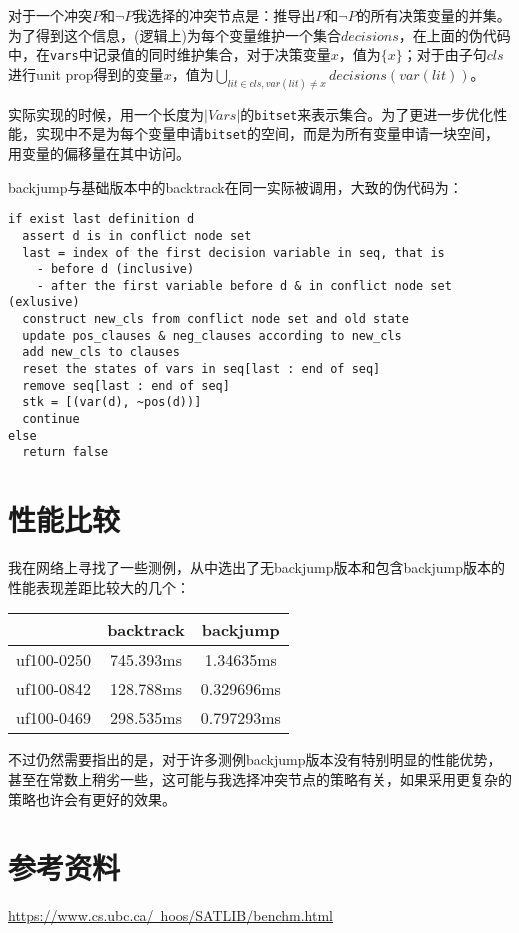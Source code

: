 \documentclass[12pt, UTF8]{article}
\begin{document}
对于一个冲突$P$和$\lnot P$我选择的冲突节点是：推导出$P$和$\lnot P$的所有决策变量的并集。为了得到这个信息，(逻辑上)为每个变量维护一个集合$decisions$，在上面的伪代码中，在\lstinline|vars|中记录值的同时维护集合，对于决策变量$x$，值为$\{x\}$；对于由子句$cls$进行unit prop得到的变量$x$，值为$\bigcup_{lit \in cls, var(lit) \ne x} decisions(var(lit))$。

实际实现的时候，用一个长度为$\left | Vars \right |$的\lstinline|bitset|来表示集合。为了更进一步优化性能，实现中不是为每个变量申请\lstinline|bitset|的空间，而是为所有变量申请一块空间，用变量的偏移量在其中访问。

backjump与基础版本中的backtrack在同一实际被调用，大致的伪代码为：

\begin{lstlisting}
if exist last definition d
  assert d is in conflict node set
  last = index of the first decision variable in seq, that is
    - before d (inclusive)
    - after the first variable before d & in conflict node set (exlusive)
  construct new_cls from conflict node set and old state
  update pos_clauses & neg_clauses according to new_cls
  add new_cls to clauses
  reset the states of vars in seq[last : end of seq]
  remove seq[last : end of seq]
  stk = [(var(d), ~pos(d))] 
  continue
else
  return false
\end{lstlisting}

\section{性能比较}

我在网络上寻找了一些测例，从中选出了无backjump版本和包含backjump版本的性能表现差距比较大的几个：\newline

\begin{center}
  \begin{tabular}{|c|c|c|}
    \hline            & backtrack & backjump \\
    \hline uf100-0250 & 745.393ms & 1.34635ms \\
    \hline uf100-0842 & 128.788ms & 0.329696ms \\
    \hline uf100-0469 & 298.535ms & 0.797293ms \\
    \hline
  \end{tabular}
\end{center}

不过仍然需要指出的是，对于许多测例backjump版本没有特别明显的性能优势，甚至在常数上稍劣一些，这可能与我选择冲突节点的策略有关，如果采用更复杂的策略也许会有更好的效果。

\section{参考资料}

\href{https://www.cs.ubc.ca/~hoos/SATLIB/benchm.html}{https://www.cs.ubc.ca/~hoos/SATLIB/benchm.html}
\end{document}
